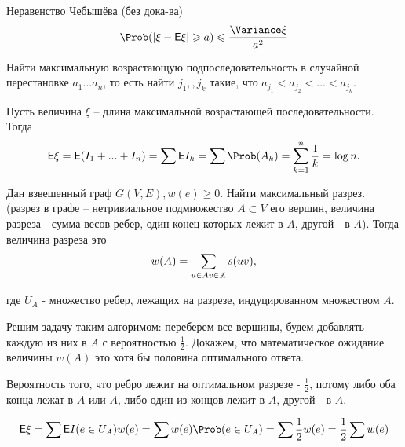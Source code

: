 \begin{theorem}{\rm Неравенство Чебышёва (без дока-ва)}
    \[
        \P(|\xi - \E\xi| \geqslant{a}) \leqslant{\frac{\D\xi}{a^2}}
    \]
\end{theorem}

\begin{example}
    
    Найти максимальную возрастающую подпоследовательность в случайной перестановке $a_1...a_n$, то есть найти $j_1,,j_k$ такие, что $a_{j_1} < a_{j_2} < ... < a_{j_k}$.

    \begin{algorithm}
    \begin{algorithmic}
        \EndIf
      \EndFor
    \end{algorithmic}
    \end{algorithm}

\end{example}


Пусть величина $\xi$ -- длина максимальной возрастающей последовательности. Тогда
\[
    \E\xi = \E(I_1 +...+ I_n) = \sum \E I_k = \sum \P(A_k) = \sum_{k=1}^{n} \frac{1}{k} = \log n.
\]


\begin{example}
    Дан взвешенный граф $G(V,E), w(e) \geq 0$. Найти максимальный разрез. (разрез в графе -- нетривиальное подмножество $A \subset V$ его вершин, величина разреза - сумма весов ребер, один конец которых лежит в $A$, другой - в $\overline{A}$). Тогда величина разреза это
    \[
        w(A)=\sum \limits_{u \in A \\ v \in \not{A}} s(uv),
    \]

    где $U_A$ - множество ребер, лежащих на разрезе, индуцированном множеством $A$. \par
    
    Решим задачу таким алгоримом: переберем все вершины, будем добавлять каждую из них в $A$ с
    вероятностью $\frac{1}{2}$. Докажем, что математическое ожидание величины $w(A)$ это хотя бы половина оптимального ответа. \par
    
    Вероятность того, что ребро лежит на оптимальном разрезе - $\frac{1}{2}$, потому либо оба конца лежат в $A$ или $\overline{A}$, либо один из концов лежит в $A$, другой - в $\overline{A}$. \par
    \[
        \E\xi = \sum \E I(e \in U_A)w(e) = \sum w(e)\P(e \in U_A) = \sum \frac{1}{2} w(e) = \frac{1}{2} \sum w(e)
    \]
\end{example}

